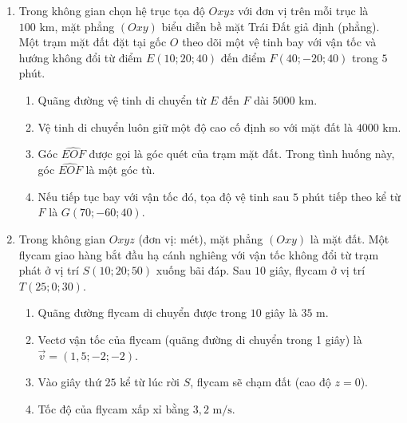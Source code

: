 \documentclass[12pt]{article}
\begin{document}
\begin{enumerate}[label=\textbf{Câu \arabic*:}, leftmargin=*]
		\begin{enumerate}[label=\alph*)]
			\item Khinh khí cầu bay qua vị trí điểm $P(8; 13; 5)$ vào thời điểm $t = 1$ giờ.
			\item Vectơ độ dời của khinh khí cầu trong $2$ giờ là $\overrightarrow{MN} = (12; 16; 8)$.
			\item Tốc độ bay của khinh khí cầu (làm tròn đến hàng đơn vị) là $11\text{ km/h}$.
			\item Sau $3$ giờ kể từ lúc xuất phát, vị trí của khinh khí cầu là $Q(20; 29; 13)$.
		\end{enumerate}
		
		\vspace{3mm}
		\item
		Trong không gian chọn hệ trục tọa độ $Oxyz$ với đơn vị trên mỗi trục là $100\text{ km}$, mặt phẳng $(Oxy)$ biểu diễn bề mặt Trái Đất giả định (phẳng). Một trạm mặt đất đặt tại gốc $O$ theo dõi một vệ tinh bay với vận tốc và hướng không đổi từ điểm $E(10; 20; 40)$ đến điểm $F(40; -20; 40)$ trong $5$ phút. 
		
		\begin{enumerate}[label=\alph*)]
			\item Quãng đường vệ tinh di chuyển từ $E$ đến $F$ dài $5000\text{ km}$.
			\item Vệ tinh di chuyển luôn giữ một độ cao cố định so với mặt đất là $4000\text{ km}$.
			\item Góc $\widehat{EOF}$ được gọi là góc quét của trạm mặt đất. Trong tình huống này, góc $\widehat{EOF}$ là một góc tù.
			\item Nếu tiếp tục bay với vận tốc đó, tọa độ vệ tinh sau $5$ phút tiếp theo kể từ $F$ là $G(70; -60; 40)$.
		\end{enumerate}
		
		\vspace{3mm}
		\item 
		Trong không gian $Oxyz$ (đơn vị: mét), mặt phẳng $(Oxy)$ là mặt đất. Một flycam giao hàng bắt đầu hạ cánh nghiêng với vận tốc không đổi từ trạm phát ở vị trí $S(10; 20; 50)$ xuống bãi đáp. Sau $10$ giây, flycam ở vị trí $T(25; 0; 30)$.
		
		\begin{enumerate}[label=\alph*)]
			\item Quãng đường flycam di chuyển được trong $10$ giây là $35\text{ m}$.
			\item Vectơ vận tốc của flycam (quãng đường di chuyển trong 1 giây) là $\vec{v} = (1,5; -2; -2)$.
			\item Vào giây thứ $25$ kể từ lúc rời $S$, flycam sẽ chạm đất (cao độ $z=0$).
			\item Tốc độ của flycam xấp xỉ bằng $3,2\text{ m/s}$.
		\end{enumerate}
		

\end{enumerate}
\end{document}
